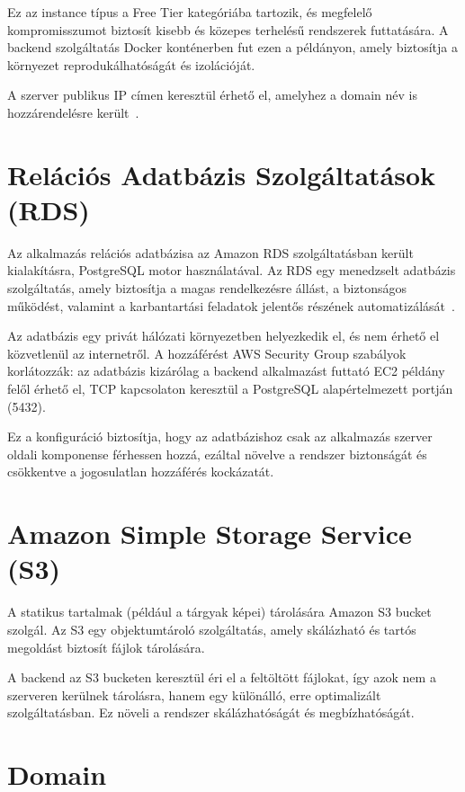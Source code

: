 \documentclass[
]{thesis-ekf}
\theoremstyle{definition}
\theoremstyle{remark}
\begin{document}
Ez az instance típus a Free Tier kategóriába tartozik, és megfelelő kompromisszumot biztosít kisebb és közepes terhelésű rendszerek futtatására. A backend szolgáltatás Docker konténerben fut ezen a példányon, amely biztosítja a környezet reprodukálhatóságát és izolációját.

A szerver publikus IP címen keresztül érhető el, amelyhez a domain név is hozzárendelésre került~\cite{godaddy}.

\section{Relációs Adatbázis Szolgáltatások (RDS)}

Az alkalmazás relációs adatbázisa az Amazon RDS szolgáltatásban került kialakításra, PostgreSQL motor használatával. Az RDS egy menedzselt adatbázis szolgáltatás, amely biztosítja a magas rendelkezésre állást, a biztonságos működést, valamint a karbantartási feladatok jelentős részének automatizálását~\cite{aws_rds}.

Az adatbázis egy privát hálózati környezetben helyezkedik el, és nem érhető el közvetlenül az internetről. A hozzáférést AWS Security Group szabályok korlátozzák: az adatbázis kizárólag a backend alkalmazást futtató EC2 példány felől érhető el, TCP kapcsolaton keresztül a PostgreSQL alapértelmezett portján (5432).

Ez a konfiguráció biztosítja, hogy az adatbázishoz csak az alkalmazás szerver oldali komponense férhessen hozzá, ezáltal növelve a rendszer biztonságát és csökkentve a jogosulatlan hozzáférés kockázatát.

\section{Amazon Simple Storage Service (S3)}

A statikus tartalmak (például a tárgyak képei) tárolására Amazon S3 bucket szolgál. Az S3 egy objektumtároló szolgáltatás, amely skálázható és tartós megoldást biztosít fájlok tárolására.

A backend az S3 bucketen keresztül éri el a feltöltött fájlokat, így azok nem a szerveren kerülnek tárolásra, hanem egy különálló, erre optimalizált szolgáltatásban. Ez növeli a rendszer skálázhatóságát és megbízhatóságát.

\section{Domain}
\end{document}
